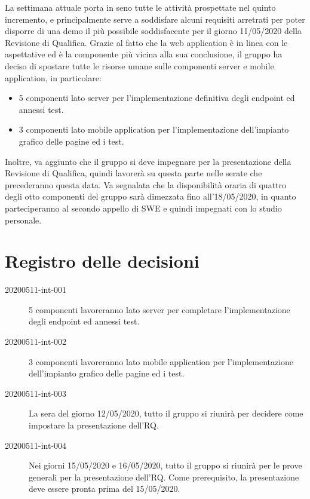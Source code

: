 \documentclass{article}
\begin{document}
La settimana attuale porta in seno tutte le attività prospettate nel quinto incremento, e principalmente serve a soddisfare alcuni requisiti arretrati per poter disporre di una demo il più possibile soddisfacente per il giorno 11/05/2020 della Revisione di Qualifica.
Grazie al fatto che la web application è in linea con le aspettative ed è la componente più vicina alla sua conclusione, il gruppo ha deciso di spostare tutte le risorse umane sulle componenti server e mobile application, in particolare:
\begin{itemize}
  \item 5 componenti lato server per l'implementazione definitiva degli endpoint ed annessi test.
  \item 3 componenti lato mobile application per l'implementazione dell'impianto grafico delle pagine ed i test.
\end{itemize}
Inoltre, va aggiunto che il gruppo si deve impegnare per la presentazione della Revisione di Qualifica, quindi lavorerà su questa parte nelle serate che precederanno questa data.
Va segnalata che la disponibilità oraria di quattro degli otto componenti del gruppo sarà dimezzata fino all'18/05/2020, in quanto parteciperanno al secondo appello di SWE e quindi impegnati con lo studio personale.

\newpage
\section{Registro delle decisioni}%
\label{sec:registro_delle_decisioni}

\begin{description}
  \item[20200511-int-001] 5 componenti lavoreranno lato server per completare l'implementazione degli endpoint ed annessi test.
  \item[20200511-int-002] 3 componenti lavoreranno lato mobile application per l'implementazione dell'impianto grafico delle pagine ed i test.
  \item[20200511-int-003] La sera del giorno 12/05/2020, tutto il gruppo si riunirà per decidere come impostare la presentazione dell'RQ\@.
  \item[20200511-int-004] Nei giorni 15/05/2020 e 16/05/2020, tutto il gruppo si riunirà per le prove generali per la presentazione dell'RQ\@. Come prerequisito, la presentazione deve essere pronta prima del 15/05/2020.
\end{description}

\end{document}

